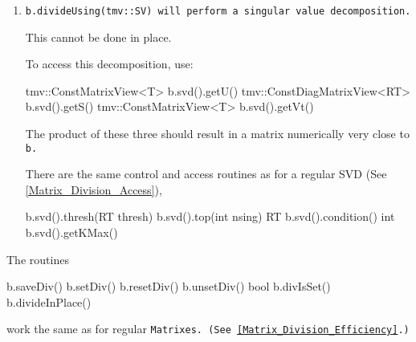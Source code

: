 \begin{enumerate}
The same kind of convolutions need to be done to perform this in place as 
for the LU decomposition.

To access this decomposition, use:\footnote{
I have not yet made a version of the \tt{PackedQ} class for \tt{BandMatrix}.
So unfortunately, here \tt{getQ()} creates the matrix directly and is thus
rather inefficient.}
\begin{tmvcode}
bool b.qrd().IsTrans()
tmv::Matrix<T> b.qrd().getQ()
tmv::ConstBandMatrixView<T> b.qrd().getR()
\end{tmvcode}
The following should result in a matrix numerically very close to \tt{b}.
\begin{tmvcode}
tmv::Matrix<T> m2(b.nrows,b.ncols);
tmv::MatrixView<T> m2v = 
      b.qrd().IsTrans() ? b2.transpose() : b2.view();
m2v = b.qrd().getQ() * b.qrd().getR();
\end{tmvcode}

\item
\tt{b.divideUsing(tmv::SV)} will perform a singular value decomposition.

This cannot be done in place.

To access this decomposition, use:
\begin{tmvcode}
tmv::ConstMatrixView<T> b.svd().getU()
tmv::ConstDiagMatrixView<RT> b.svd().getS()
tmv::ConstMatrixView<T> b.svd().getVt()
\end{tmvcode}
The product of these three
should result in a matrix numerically very close to \tt{b}.

There are the same control and access routines as for a regular SVD
(See \ref{Matrix_Division_Access}),
\begin{tmvcode}
b.svd().thresh(RT thresh)
b.svd().top(int nsing)
RT b.svd().condition()
int b.svd().getKMax()
\end{tmvcode}

\end{enumerate}
The routines 
\begin{tmvcode}
b.saveDiv()
b.setDiv()
b.resetDiv()
b.unsetDiv()
bool b.divIsSet()
b.divideInPlace()
\end{tmvcode}
work the same as for regular \tt{Matrix}es.
(See \ref{Matrix_Division_Efficiency}.)

